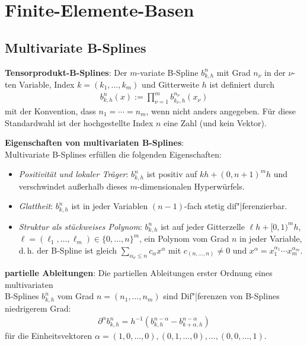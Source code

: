 \chapter{%
    Finite-Elemente-Basen%
}

\section{%
    Multivariate B-Splines%
}

\textbf{Tensorprodukt-B-Splines}:
Der $m$-variate B-Spline $b_{k,h}^n$ mit Grad $n_\nu$ in der $\nu$-ten Variable,
Index $k = (k_1, \dotsc, k_m)$ und Gitterweite $h$ ist definiert durch
\begin{align*}
    b_{k,h}^n(x) := \prod_{\nu=1}^m b_{k_\nu,h}^{n_\nu}(x_\nu)
\end{align*}
mit der Konvention, dass $n_1 = \dotsb = n_m$, wenn nicht anders angegeben.
Für diese Standardwahl ist der hochgestellte Index $n$ eine Zahl (und kein Vektor).

\linie

\textbf{Eigenschaften von multivariaten B-Splines}:\\
Multivariate B-Splines erfüllen die folgenden Eigenschaften:
\begin{itemize}
    \item
    \emph{Positivität und lokaler Träger}:
    $b_{k,h}^n$ ist positiv auf $kh + (0, n + 1)^m h$ und verschwindet außerhalb dieses
    $m$-dimensionalen Hyperwürfels.

    \item
    \emph{Glattheit}:
    $b_{k,h}^n$ ist in jeder Variablen $(n - 1)$-fach stetig dif"|ferenzierbar.

    \item
    \emph{Struktur als stückweises Polynom}:
    $b_{k,h}^n$ ist auf jeder Gitterzelle $\ell h + [0, 1)^m h$,\\
    $\ell = (\ell_1, \dotsc, \ell_m) \in \{0, \dotsc, n\}^m$,
    ein Polynom vom Grad $n$ in jeder Variable, d.\,h. der B-Spline ist gleich
    $\sum_{\alpha_\nu \le n} c_\alpha x^\alpha$ mit $c_{(n, \dotsc, n)} \not= 0$
    und $x^\alpha = x_1^{\alpha_1} \dotsm x_m^{\alpha_m}$.
\end{itemize}

\textbf{partielle Ableitungen}:
Die partiellen Ableitungen erster Ordnung eines multivariaten\\
B-Splines $b_{k,h}^n$ vom Grad $n = (n_1, \dotsc, n_m)$ sind
Dif"|ferenzen von B-Splines niedrigerem Grad:
\begin{align*}
    \partial^\alpha b_{k,h}^n = h^{-1} (b_{k,h}^{n-\alpha} - b_{k+\alpha,h}^{n-\alpha})
\end{align*}
für die Einheitsvektoren $\alpha = (1, 0, \dotsc, 0), (0, 1, \dotsc, 0), \dotsc,
(0, 0, \dotsc, 1)$.

